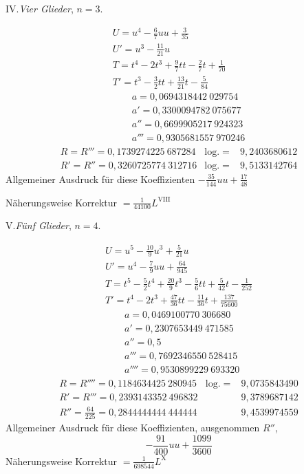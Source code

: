 \par{}\begin{center}IV.\quad\textit{Vier Glieder}, \(n=3\).\end{center}
\[
\begin{array}{l}
U=u^4-\frac{6}{7}uu+\frac{3}{35}\\
U'=u^3-\frac{11}{21}u\\
T=t^4-2t^3+\frac{9}{7}tt-\frac{2}{7}t+\frac{1}{70}\\
T'=t^3-\frac{3}{2}tt+\frac{13}{21}t-\frac{5}{84}\\
\qquad a=0{,}0694318442\ 029754\\
\qquad a'=0{,}3300094782\ 075677\\
\qquad a''=0{,}6699905217\ 924323\\
\qquad a'''=0{,}9305681557\ 970246
\end{array}
\]
\[
\begin{array}{lll}
R=R'''=0{,}1739274225\ 687284&\mathrm{log.}=&9{,}2403680612\\
R'=R''=0{,}3260725774\ 312716&\mathrm{log.}=&9{,}5133142764
\end{array}
\]
\noindent Allgemeiner Ausdruck für diese Koeffizienten \(-\frac{35}{144}uu+\frac{17}{48}\)

\noindent Näherungsweise Korrektur \(=\frac{1}{44100}L^{\mathrm{VIII}}\)
\endgroup
{}
\begingroup\renewcommand{\arraystretch}{1.6}
\par{}\begin{center}V.\quad\textit{Fünf Glieder}, \(n=4\).\end{center}
\[
\begin{array}{l}
U=u^5-\frac{10}{9}u^3+\frac{5}{21}u\\
U'=u^4-\frac{7}{9}uu+\frac{64}{945}\\
T=t^5-\frac{5}{2}t^4+\frac{20}{9}t^3-\frac{5}{6}tt+\frac{5}{42}t-\frac{1}{252}\\
T'=t^4-2t^3+\frac{47}{36}tt-\frac{11}{36}t+\frac{137}{75600}\\
\qquad a=0{,}0469100770\ 306680\\
\qquad a'=0{,}2307653449\ 471585\\
\qquad a''=0{,}5\\
\qquad a'''=0{,}7692346550\ 528415\\
\qquad a''''=0{,}9530899229\ 693320
\end{array}
\]
\[
\begin{array}{lll}
R=R''''=0{,}1184634425\ 280945&\mathrm{log.}=&9{,}0735843490\\
R'=R'''=0{,}2393143352\ 496832&&9{,}3789687142\\
R''=\frac{64}{225}=0{,}2844444444\ 444444&&9{,}4539974559
\end{array}
\]
\noindent Allgemeiner Ausdruck für diese Koeffizienten, ausgenommen \(R''\),
\[
-\frac{91}{400}uu+\frac{1099}{3600}
\]
\noindent Näherungsweise Korrektur \(=\frac{1}{698544}L^{\mathrm{X}}\)

